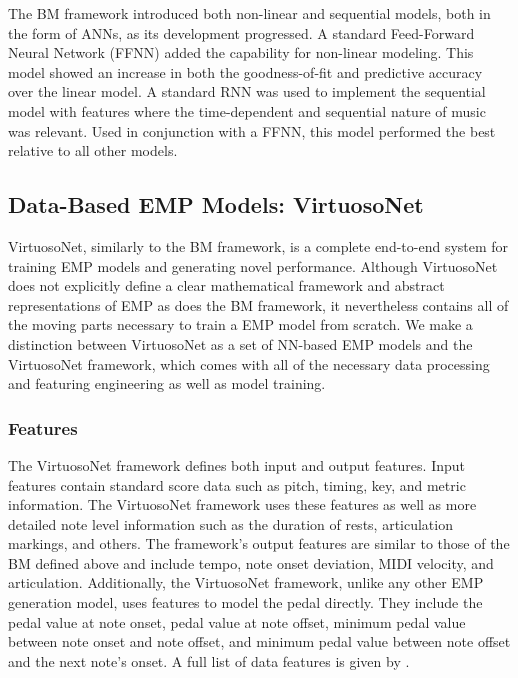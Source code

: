 The BM framework introduced both non-linear and sequential models, both in the form of ANNs, as its development progressed. A standard Feed-Forward Neural Network (FFNN) added the capability for non-linear modeling. This model showed an increase in both the goodness-of-fit and predictive accuracy over the linear model. A standard RNN was used to implement the sequential model with features where the time-dependent and sequential nature of music was relevant. Used in conjunction with a FFNN, this model performed the best relative to all other models.

\newcommand{\vnet}{VirtuosoNet}
\newcommand{\vnetf}{VirtuosoNet framework}

\subsection{Data-Based EMP Models: \vnet{}}
\vnet{}, similarly to the BM framework, is a complete end-to-end system for training EMP models and generating novel performance. Although \vnet{} does not explicitly define a clear mathematical framework and abstract representations of EMP as does the BM framework, it nevertheless contains all of the moving parts necessary to train a EMP model from scratch. We make a distinction between \vnet{} as a set of NN-based EMP models and the \vnetf, which comes with all of the necessary data processing and featuring engineering as well as model training. 

\subsubsection{Features}
The \vnetf{} defines both input and output features. Input features contain standard score data such as pitch, timing, key, and metric information. The \vnetf{} uses these features as well as more detailed note level information such as the duration of rests, articulation markings, and others. The framework's output features are similar to those of the BM defined above and include tempo, note onset deviation, MIDI velocity, and articulation. Additionally, the \vnetf{}, unlike any other EMP generation model, uses features to model the pedal directly. They include the pedal value at note onset, pedal value at note offset, minimum pedal value between note onset and note offset, and minimum pedal value between note offset and the next note's onset. A full list of data features is given by \citet{jeong2019score}. 

